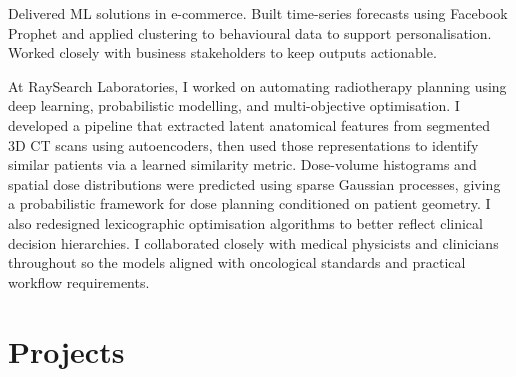 \documentclass[11pt,a4paper]{moderncv}
\begin{document}
\label{sec:valtech}
 {
    Delivered ML solutions in e-commerce. Built time-series forecasts using Facebook Prophet and applied clustering to behavioural data to support personalisation. Worked closely with business stakeholders to keep outputs actionable.
}{}

\label{sec:raysearch}
 {
    At RaySearch Laboratories, I worked on automating radiotherapy planning using deep learning, probabilistic modelling, and multi-objective optimisation. I developed a pipeline that extracted latent anatomical features from segmented 3D CT scans using autoencoders, then used those representations to identify similar patients via a learned similarity metric.
    \newline\hspace*{2em}
    Dose-volume histograms and spatial dose distributions were predicted using sparse Gaussian processes, giving a probabilistic framework for dose planning conditioned on patient geometry. I also redesigned lexicographic optimisation algorithms to better reflect clinical decision hierarchies.
    \newline\hspace*{2em}
    I collaborated closely with medical physicists and clinicians throughout so the models aligned with oncological standards and practical workflow requirements.
}{}


\section{Projects}
\end{document}
